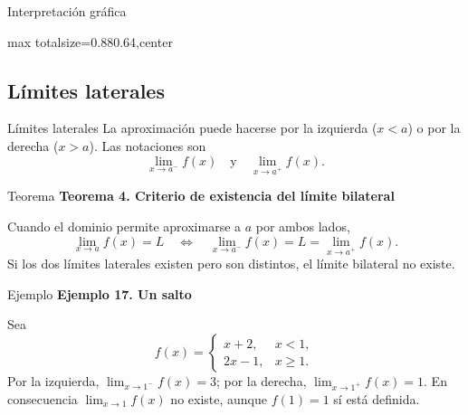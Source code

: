 \documentclass[12pt,aspectratio=169]{beamer}
\begin{document}
\begin{frame}[t,allowframebreaks]{Interpretación gráfica}
\begin{center}
\begin{adjustbox}{max totalsize={0.88\linewidth}{0.64\textheight},center}\end{adjustbox}
\end{center}
\end{frame}


\subsection{Límites laterales}

\begin{frame}[t,allowframebreaks]{Límites laterales}
La aproximación puede hacerse por la izquierda ($x<a$) o por la derecha ($x>a$). Las notaciones son
\[
 \lim_{x\to a^-}f(x)\quad\text{y}\quad \lim_{x\to a^+}f(x).
\]
\end{frame}


\begin{frame}[t,allowframebreaks]{Teorema}
{\color{azul}\bfseries Teorema 4. Criterio de existencia del límite bilateral}\par\medskip

Cuando el dominio permite aproximarse a $a$ por ambos lados,
\[
 \boxed{\lim_{x\to a}f(x)=L\quad\Longleftrightarrow\quad
 \lim_{x\to a^-}f(x)=L=\lim_{x\to a^+}f(x).}
\]
Si los dos límites laterales existen pero son distintos, el límite bilateral no existe.
\end{frame}


\begin{frame}[t,allowframebreaks]{Ejemplo}
{\color{azul}\bfseries Ejemplo 17. Un salto}\par\medskip

Sea
\[
 f(x)=\begin{cases}x+2,&x<1,\\ 2x-1,&x\ge1.\end{cases}
\]
Por la izquierda, $\lim_{x\to1^-}f(x)=3$; por la derecha, $\lim_{x\to1^+}f(x)=1$. En consecuencia $\lim_{x\to1}f(x)$ no existe, aunque $f(1)=1$ sí está definida.
\end{frame}
\end{document}
